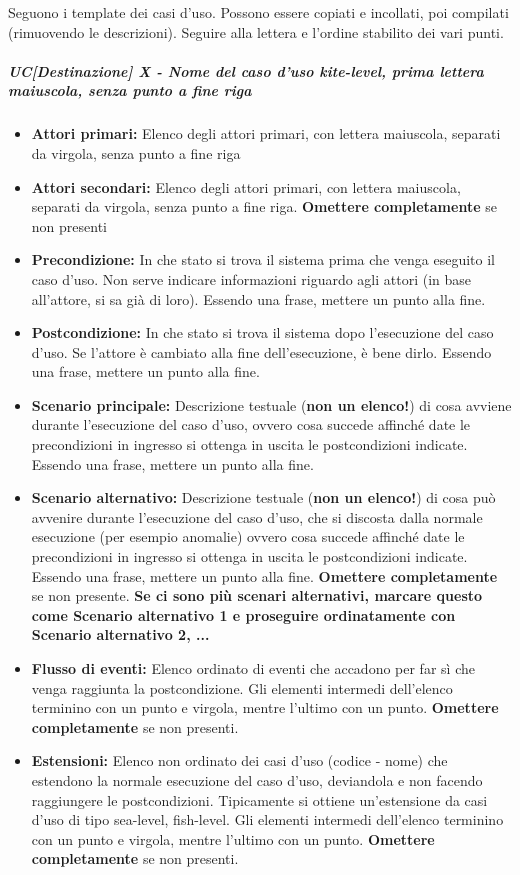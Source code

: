 Seguono i template dei casi d'uso. Possono essere copiati e incollati, poi compilati (rimuovendo le descrizioni). Seguire alla lettera e l'ordine stabilito dei vari punti.
\subparagraph{UC[Destinazione] X - Nome del caso d'uso kite-level, prima lettera maiuscola, senza punto a fine riga} %
\begin{itemize}
\item \textbf{Attori primari:} Elenco degli attori primari, con lettera maiuscola, separati da virgola, senza punto a fine riga
\item \textbf{Attori secondari:} Elenco degli attori primari, con lettera maiuscola, separati da virgola, senza punto a fine riga. \textbf{Omettere completamente} se non presenti
\item \textbf{Precondizione:} In che stato si trova il sistema prima che venga eseguito il caso d'uso. Non serve indicare informazioni riguardo agli attori (in base all'attore, si sa già di loro). Essendo una frase, mettere un punto alla fine.
\item \textbf{Postcondizione:} In che stato si trova il sistema dopo l'esecuzione del caso d'uso. Se l'attore è cambiato alla fine dell'esecuzione, è bene dirlo. Essendo una frase, mettere un punto alla fine.
\item \textbf{Scenario principale:} Descrizione testuale (\textbf{non un elenco!}) di cosa avviene durante l'esecuzione del caso d'uso, ovvero cosa succede affinché date le precondizioni in ingresso si ottenga in uscita le postcondizioni indicate. Essendo una frase, mettere un punto alla fine.
\item \textbf{Scenario alternativo:} Descrizione testuale (\textbf{non un elenco!}) di cosa può avvenire durante l'esecuzione del caso d'uso, che si discosta dalla normale esecuzione (per esempio anomalie) ovvero cosa succede affinché date le precondizioni in ingresso si ottenga in uscita le postcondizioni indicate. Essendo una frase, mettere un punto alla fine. \textbf{Omettere completamente} se non presente. \textbf{Se ci sono più scenari alternativi, marcare questo come Scenario alternativo 1 e proseguire ordinatamente con Scenario alternativo 2, ...}
\item \textbf{Flusso di eventi:} Elenco ordinato di eventi che accadono per far sì che venga raggiunta la postcondizione. Gli elementi intermedi dell'elenco terminino con un punto e virgola, mentre l'ultimo con un punto. \textbf{Omettere completamente} se non presenti.
\item \textbf{Estensioni:} Elenco non ordinato dei casi d'uso (codice - nome) che estendono la normale esecuzione del caso d'uso, deviandola e non facendo raggiungere le postcondizioni. Tipicamente si ottiene un'estensione da casi d'uso di tipo sea-level, fish-level. Gli elementi intermedi dell'elenco terminino con un punto e virgola, mentre l'ultimo con un punto. \textbf{Omettere completamente} se non presenti.

\end{itemize}

